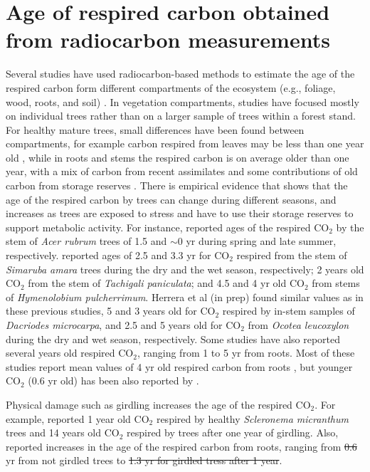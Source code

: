 \documentclass[bg, manuscript]{copernicus}
\providecommand{\DIFadd}[1]{{\protect\color{blue}\uwave{#1}}} %
\providecommand{\DIFdel}[1]{{\protect\color{red}\sout{#1}}}                      %
\providecommand{\DIFaddbegin}{} %
\providecommand{\DIFaddend}{} %
\providecommand{\DIFdelbegin}{} %
\providecommand{\DIFdelend}{} %
\begin{document}
\section{Age of respired carbon obtained from radiocarbon measurements}
Several studies have used radiocarbon-based methods to estimate the age of the respired carbon form different compartments of the ecosystem (e.g., foliage, wood, roots, and soil) \citep{carbone:2007, Carbone:200713, carbone:2013, muhr:2013, Muhr:2018, Trumbore:2015}. 
In vegetation compartments, studies have focused mostly on individual trees rather than on a larger sample of trees within a forest stand. For healthy mature trees, small differences have been found between compartments, for example carbon respired from leaves may be less than one year old \citep{carbone:2007}, while in roots and stems the respired carbon is on average older than one year, with a mix of carbon from recent assimilates and some contributions of old carbon from storage reserves \citep{Muhr:2018}. There is empirical evidence that shows that the age of the respired carbon by trees can change during different seasons, and increases as trees are exposed to stress and have to use their storage reserves to support metabolic activity.  For instance, \citet{carbone:2013} reported ages of the respired CO$_2$ by the stem of \textit{Acer rubrum} trees of 1.5 and  $\sim$0 yr during spring and late summer, respectively. \citet{muhr:2013} reported ages of 2.5 and 3.3 yr for CO$_2$ respired from the stem of \textit{Simaruba amara} trees during the dry and the wet season, respectively; 2 years old CO$_2$ from the stem of \textit{Tachigali paniculata}; and 4.5 and 4 yr old CO$_2$ from stems of \textit{Hymenolobium pulcherrimum}. Herrera et al (in prep) found similar values as in these previous studies, 5 and 3 years old for CO$_2$ respired by in-stem samples of \textit{Dacriodes microcarpa}, and 2.5 and 5 years old for CO$_2$ from \textit{Ocotea leucoxylon} during the dry  and wet season, respectively. Some studies have also reported several years old respired CO$_2$, ranging from 1 to 5 yr from roots. Most of these studies report mean values of 4 yr old respired carbon from roots \citep{CZIMCZIK:2006td, Schuur:2006tm, carbone:2007}, but younger CO$_2$ (0.6 yr old) has been also reported by \citet{Hilman:2021us}. 

Physical damage such as girdling increases the age of the respired CO$_2$. For example, \citet{Muhr:2018} reported 1 year old CO$_2$ respired by healthy \textit{Scleronema micranthum} trees and 14 years old CO$_2$ respired by trees after one year of girdling. Also, \citet{Hilman:2021us} reported increases in the age of the respired carbon from roots, ranging from \DIFdelbegin \DIFdel{0.6 }\DIFdelend \DIFaddbegin \DIFadd{0.4 }\DIFaddend yr from not girdled trees to \DIFdelbegin \DIFdel{1.3 yr for girdled tress after 1 year}\DIFdelend \DIFaddbegin \DIFadd{1.2 yr for tress after three months of girdling}\DIFaddend .  
\end{document}
